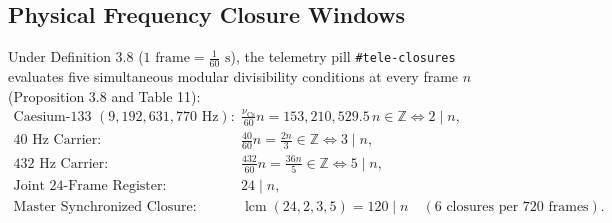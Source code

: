 \documentclass[11pt, a4paper]{article}
\begin{document}
\subsection{Physical Frequency Closure Windows}
Under Definition 3.8 ($1\text{ frame} = \frac{1}{60}\text{ s}$), the telemetry pill \texttt{\#tele-closures} evaluates five simultaneous modular divisibility conditions at every frame $n$ (Proposition 3.8 and Table 11):
\begin{align}
\text{Caesium-133 } (9,192,631,770\text{ Hz}): &\quad \frac{\nu_{\text{Cs}}}{60} n = 153,210,529.5\,n \in \mathbb{Z} \iff 2 \mid n, \\
\text{40 Hz Carrier}: &\quad \frac{40}{60} n = \frac{2n}{3} \in \mathbb{Z} \iff 3 \mid n, \\
\text{432 Hz Carrier}: &\quad \frac{432}{60} n = \frac{36n}{5} \in \mathbb{Z} \iff 5 \mid n, \\
\text{Joint 24-Frame Register}: &\quad 24 \mid n, \\
\text{Master Synchronized Closure}: &\quad \operatorname{lcm}(24, 2, 3, 5) = 120 \mid n \quad (6 \text{ closures per } 720 \text{ frames}).
\end{align}
\end{document}
